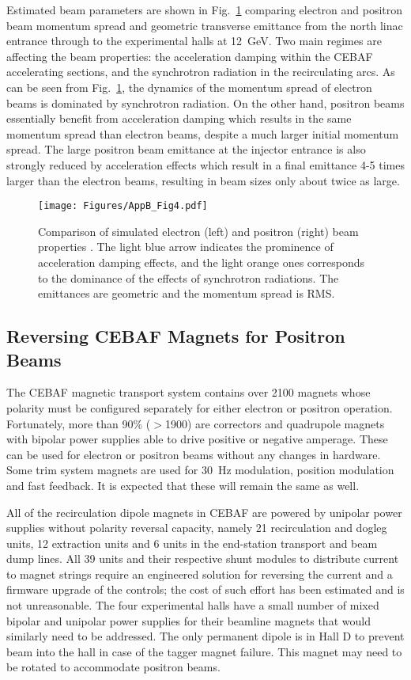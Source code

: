 Estimated beam parameters are shown in Fig.~\ref{AppB_Figure4} comparing electron and positron beam momentum spread and geometric transverse emittance from the north linac entrance through to the experimental halls at 12~GeV. Two main regimes are affecting the beam properties: the acceleration damping within the CEBAF accelerating sections, and the synchrotron radiation in the recirculating arcs. As can be seen from Fig.~\ref{AppB_Figure4}, the dynamics of the momentum spread of electron beams is dominated by synchrotron radiation. On the other hand, positron beams essentially benefit from acceleration damping which results in the same momentum spread than electron beams, despite a much larger initial momentum spread. The large positron beam emittance at the injector entrance is also strongly reduced by acceleration effects which result in a final emittance 4-5 times larger than the electron beams, resulting in beam sizes only about twice as large.

%
\begin{figure}[tbh]
 \centering
 \texttt{[image: Figures/AppB\_Fig4.pdf]}
 \caption{Comparison of simulated electron (left) and positron (right) beam properties \cite{Proceedings:RoblinJPOS2017}. The light blue arrow indicates the prominence of acceleration damping effects, and the light orange ones corresponds to the dominance of the effects of synchrotron radiations. The emittances are geometric and the momentum spread is RMS.}
 \label{AppB_Figure4}
\end{figure}
%

\subsection{Reversing CEBAF Magnets for Positron Beams}

The CEBAF magnetic transport system contains over 2100 magnets whose polarity must be configured separately for either electron or positron operation.  Fortunately, more than 90\% ($>$1900) are correctors and quadrupole magnets with bipolar power supplies able to drive positive or negative amperage. These can be used for electron or positron beams without any changes in hardware. Some trim system magnets are used for 30~Hz modulation, position modulation and fast feedback. It is expected that these will remain the same as well.

All of the recirculation dipole magnets in CEBAF are powered by unipolar power supplies without polarity reversal capacity, namely 21 recirculation and dogleg units, 12 extraction units and 6 units in the end-station transport and beam dump lines.  All 39 units and their respective shunt modules to distribute current to magnet strings require an engineered solution for reversing the current and a firmware upgrade of the controls; the cost of such effort has been estimated and is not unreasonable. The four experimental halls have a small number of mixed bipolar and unipolar power supplies for their beamline magnets that would similarly need to be addressed. The only permanent dipole is in Hall D to prevent beam into the hall in case of the tagger magnet failure. This magnet may need to be rotated to accommodate positron beams. 

